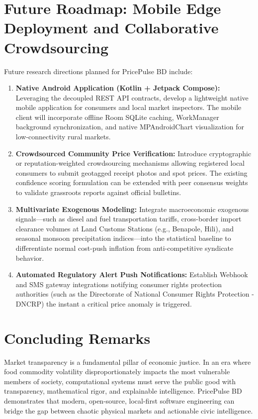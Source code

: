 \section{Future Roadmap: Mobile Edge Deployment and Collaborative Crowdsourcing}
Future research directions planned for PricePulse BD include:
\begin{enumerate}
    \item \textbf{Native Android Application (Kotlin + Jetpack Compose):} Leveraging the decoupled REST API contracts, develop a lightweight native mobile application for consumers and local market inspectors. The mobile client will incorporate offline Room SQLite caching, WorkManager background synchronization, and native MPAndroidChart visualization for low-connectivity rural markets.
    \item \textbf{Crowdsourced Community Price Verification:} Introduce cryptographic or reputation-weighted crowdsourcing mechanisms allowing registered local consumers to submit geotagged receipt photos and spot prices. The existing confidence scoring formulation can be extended with peer consensus weights to validate grassroots reports against official bulletins.
    \item \textbf{Multivariate Exogenous Modeling:} Integrate macroeconomic exogenous signals—such as diesel and fuel transportation tariffs, cross-border import clearance volumes at Land Customs Stations (e.g., Benapole, Hili), and seasonal monsoon precipitation indices—into the statistical baseline to differentiate normal cost-push inflation from anti-competitive syndicate behavior.
    \item \textbf{Automated Regulatory Alert Push Notifications:} Establish Webhook and SMS gateway integrations notifying consumer rights protection authorities (such as the Directorate of National Consumer Rights Protection - DNCRP) the instant a critical price anomaly is triggered.
\end{enumerate}

\section{Concluding Remarks}
Market transparency is a fundamental pillar of economic justice. In an era where food commodity volatility disproportionately impacts the most vulnerable members of society, computational systems must serve the public good with transparency, mathematical rigor, and explainable intelligence. PricePulse BD demonstrates that modern, open-source, local-first software engineering can bridge the gap between chaotic physical markets and actionable civic intelligence.
